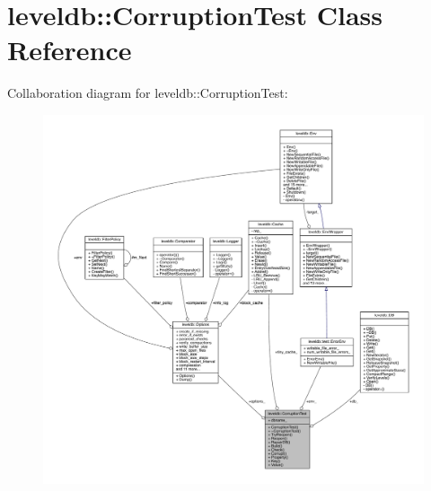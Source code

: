 \hypertarget{classleveldb_1_1_corruption_test}{}\section{leveldb\+:\+:Corruption\+Test Class Reference}
\label{classleveldb_1_1_corruption_test}


Collaboration diagram for leveldb\+:\+:Corruption\+Test\+:
\nopagebreak
\begin{figure}[H]
\begin{center}
\leavevmode
\includegraphics[width=350pt]{classleveldb_1_1_corruption_test__coll__graph}
\end{center}
\end{figure}
